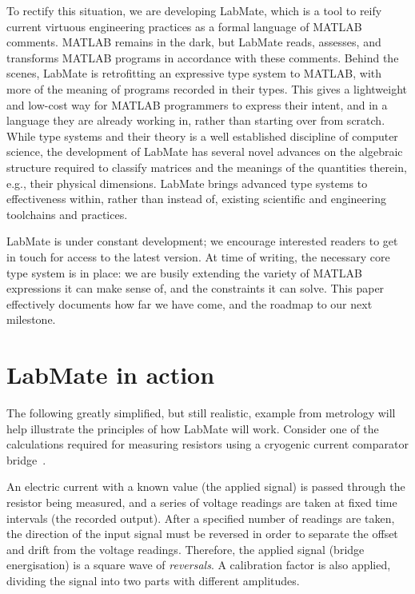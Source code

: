 \documentclass{IMEKO2024}
\begin{document}
To rectify this situation, we are developing LabMate, which is a tool
to reify current virtuous engineering practices as a formal language
of MATLAB comments. MATLAB remains in the dark, but LabMate reads,
assesses, and transforms MATLAB programs in accordance with these
comments.
%
Behind the scenes, LabMate is retrofitting an expressive type system
to MATLAB, with more of the meaning of programs recorded in their
types.
%
This gives a lightweight and low-cost way for MATLAB programmers to
express their intent, and in a language they are already working in,
rather than starting over from scratch.
%
While type systems and their theory is a well established discipline
of computer science, the development of LabMate has several novel
advances on the algebraic structure required to classify
matrices and the meanings of the quantities therein, e.g., their
physical dimensions. LabMate brings advanced type systems to
effectiveness within, rather than instead of, existing scientific and
engineering toolchains and practices.

 LabMate is under constant development; we encourage interested readers to get in touch for access to the latest version.
 At time of writing, the necessary core type system is in place: we are busily extending the variety of MATLAB expressions it can make sense of, and the constraints it can solve.
%
%
%
This paper effectively documents how far we have come, and the roadmap to our next milestone.

\section{LabMate in action}
\label{sec:example}


The following greatly simplified, but still realistic, example from metrology  will help illustrate the principles of how LabMate will work. Consider one of the calculations required for measuring resistors using a cryogenic current comparator bridge~\cite{Williams_2010}.

An electric current with a known value (the applied signal) is passed through the resistor being measured, and a series of voltage readings are taken at fixed time intervals (the recorded output). After a specified number of readings are taken, the direction of the input signal must be reversed in order to separate the offset and drift from the voltage readings. Therefore, the applied signal (bridge energisation) is a square wave of {\em reversals}. A calibration factor is also applied, dividing the signal into two parts with different amplitudes.
\end{document}
